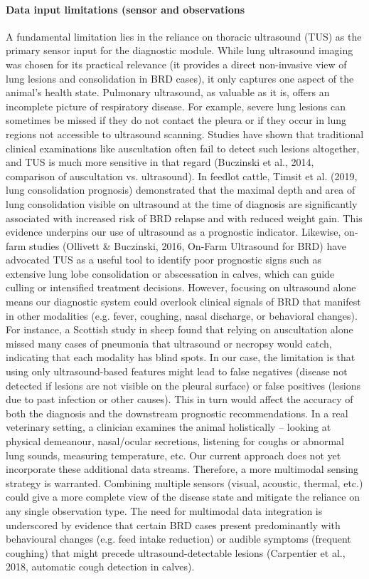\paragraph{Data input limitations (sensor and observations} A fundamental limitation lies in the reliance on thoracic ultrasound (TUS) as the primary sensor input for the diagnostic module. While lung ultrasound imaging was chosen for its practical relevance (it provides a direct non-invasive view of lung lesions and consolidation in BRD cases), it only captures one aspect of the animal’s health state. Pulmonary ultrasound, as valuable as it is, offers an incomplete picture of respiratory disease. For example, severe lung lesions can sometimes be missed if they do not contact the pleura or if they occur in lung regions not accessible to ultrasound scanning. Studies have shown that traditional clinical examinations like auscultation often fail to detect such lesions altogether, and TUS is much more sensitive in that regard (Buczinski et al., 2014, comparison of auscultation vs. ultrasound). In feedlot cattle, Timsit et al. (2019, lung consolidation prognosis) demonstrated that the maximal depth and area of lung consolidation visible on ultrasound at the time of diagnosis are significantly associated with increased risk of BRD relapse and with reduced weight gain. This evidence underpins our use of ultrasound as a prognostic indicator. Likewise, on-farm studies (Ollivett \& Buczinski, 2016, On-Farm Ultrasound for BRD) have advocated TUS as a useful tool to identify poor prognostic signs such as extensive lung lobe consolidation or abscessation in calves, which can guide culling or intensified treatment decisions. However, focusing on ultrasound alone means our diagnostic system could overlook clinical signals of BRD that manifest in other modalities (e.g. fever, coughing, nasal discharge, or behavioral changes). For instance, a Scottish study in sheep found that relying on auscultation alone missed many cases of pneumonia that ultrasound or necropsy would catch, indicating that each modality has blind spots. In our case, the limitation is that using only ultrasound-based features might lead to false negatives (disease not detected if lesions are not visible on the pleural surface) or false positives (lesions due to past infection or other causes). This in turn would affect the accuracy of both the diagnosis and the downstream prognostic recommendations. In a real veterinary setting, a clinician examines the animal holistically – looking at physical demeanour, nasal/ocular secretions, listening for coughs or abnormal lung sounds, measuring temperature, etc. Our current approach does not yet incorporate these additional data streams. Therefore, a more multimodal sensing strategy is warranted. Combining multiple sensors (visual, acoustic, thermal, etc.) could give a more complete view of the disease state and mitigate the reliance on any single observation type. The need for multimodal data integration is underscored by evidence that certain BRD cases present predominantly with behavioural changes (e.g. feed intake reduction) or audible symptoms (frequent coughing) that might precede ultrasound-detectable lesions (Carpentier et al., 2018, automatic cough detection in calves). 